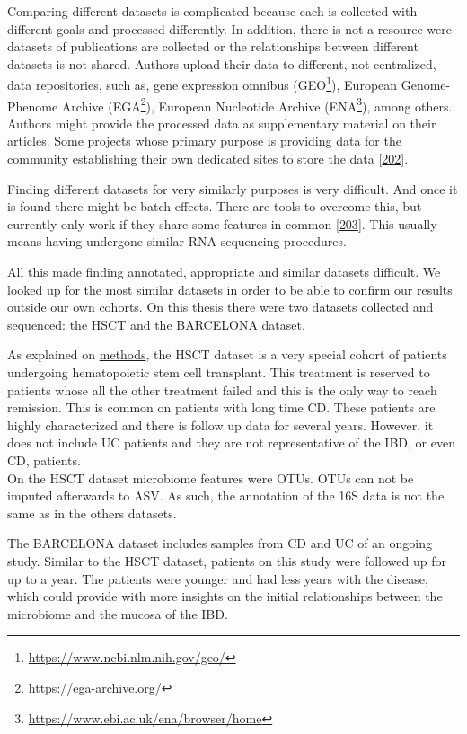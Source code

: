 \documentclass[
  a4paper,
]{book}
\DeclareRobustCommand{\href}[2]{#2\footnote{\url{#1}}}
\begin{document}
Comparing different datasets is complicated because each is collected with different goals and processed differently.
In addition, there is not a resource were datasets of publications are collected or the relationships between different datasets is not shared.
Authors upload their data to different, not centralized, data repositories, such as, gene expression omnibus (\href{https://www.ncbi.nlm.nih.gov/geo/}{GEO}), European Genome-Phenome Archive (\href{https://ega-archive.org/}{EGA}), European Nucleotide Archive (\href{https://www.ebi.ac.uk/ena/browser/home}{ENA}), among others.
Authors might provide the processed data as supplementary material on their articles.
Some projects whose primary purpose is providing data for the community establishing their own dedicated sites to store the data {[}\protect\hyperlink{ref-humanmicrobiomeprojectconsortium2012}{202}{]}.

Finding different datasets for very similarly purposes is very difficult.
And once it is found there might be batch effects.
There are tools to overcome this, but currently only work if they share some features in common {[}\protect\hyperlink{ref-ugidos2020}{203}{]}.
This usually means having undergone similar RNA sequencing procedures.

All this made finding annotated, appropriate and similar datasets difficult.
We looked up for the most similar datasets in order to be able to confirm our results outside our own cohorts.
On this thesis there were two datasets collected and sequenced: the HSCT and the BARCELONA dataset.

As explained on \protect\hyperlink{methods-hsct}{methods}, the HSCT dataset is a very special cohort of patients undergoing hematopoietic stem cell transplant.
This treatment is reserved to patients whose all the other treatment failed and this is the only way to reach remission.
This is common on patients with long time CD.
These patients are highly characterized and there is follow up data for several years.
However, it does not include UC patients and they are not representative of the IBD, or even CD, patients.\\
On the HSCT dataset microbiome features were OTUs.
OTUs can not be imputed afterwards to ASV.
As such, the annotation of the 16S data is not the same as in the others datasets.

The BARCELONA dataset includes samples from CD and UC of an ongoing study.
Similar to the HSCT dataset, patients on this study were followed up for up to a year.
The patients were younger and had less years with the disease, which could provide with more insights on the initial relationships between the microbiome and the mucosa of the IBD.
\end{document}
